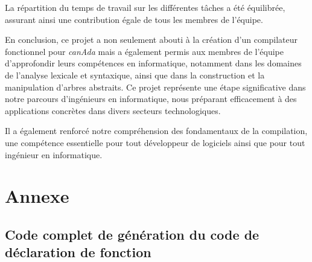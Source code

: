 \documentclass[french,a4paper]{article}
\begin{document}
    La répartition du temps de travail sur les différentes tâches a été équilibrée, assurant ainsi une contribution égale de tous les membres de l'équipe.

    En conclusion, ce projet a non seulement abouti à la création d'un compilateur fonctionnel pour \textit{canAda} mais a également permis aux membres de l'équipe d'approfondir leurs compétences en informatique, notamment dans les domaines de l'analyse lexicale et syntaxique, ainsi que dans la construction et la manipulation d'arbres abstraits.
    Ce projet représente une étape significative dans notre parcours d'ingénieurs en informatique, nous préparant efficacement à des applications concrètes dans divers secteurs technologiques.

    Il a également renforcé notre compréhension des fondamentaux de la compilation, une compétence essentielle pour tout développeur de logiciels ainsi que pour tout ingénieur en informatique.

    \section{Annexe}\label{sec:annexe}

    \subsection{Code complet de génération du code de déclaration de fonction}
\end{document}

